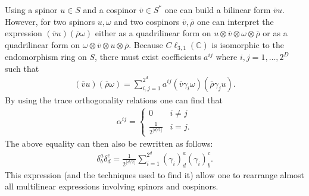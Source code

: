     Using a spinor $u\in S$ and a cospinor $\overline{v}\in S^*$ one can build a bilinear form $\overline{v}u$. However, for two spinors $u,\omega$ and two cospinors $\overline{v},\overline{\rho}$ one can interpret the expression $(\overline{v}u)(\overline{\rho}\omega)$ either as a quadrilinear form on $u\otimes\overline{v}\otimes\omega\otimes\overline{\rho}$ or as a quadrilinear form on $\omega\otimes\overline{v}\otimes u\otimes\overline{\rho}$. Because $C\ell_{3,1}(\mathbb{C})$ is isomorphic to the endomorphism ring on $S$, there must exist coefficients $a^{ij}$ where $i,j=1,\ldots,2^D$ such that
    \begin{gather}
        (\overline{v}u)(\overline{\rho}\omega) = \sum_{i,j=1}^{2^d}a^{ij}(\overline{v}\gamma_i\omega)(\overline{\rho}\gamma_ju).
    \end{gather}
    By using the trace orthogonality relations one can find that
    \begin{gather}
        \alpha^{ij} =
        \begin{cases}
            0&i\neq j\\
            \frac{1}{2^{\lfloor d/2 \rfloor}}&i=j.
        \end{cases}
    \end{gather}
    The above equality can then also be rewritten as follows:
    \begin{gather}
        \delta_b^a\delta_d^c = \frac{1}{2^{\lfloor d/2 \rfloor}}\sum_{i=1}^{2^d}(\gamma_i)_d^a(\gamma_i)_b^c.
    \end{gather}
    This expression (and the techniques used to find it) allow one to rearrange almost all multilinear expressions involving spinors and cospinors.